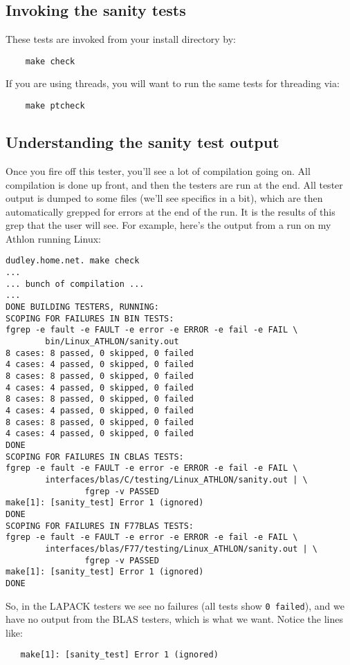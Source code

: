 \documentclass[11pt]{article}
\begin{document}
\subsection{Invoking the sanity tests}
These tests are invoked from your install directory by:
\begin{verbatim}
    make check
\end{verbatim}

If you are using threads, you will want to run the same tests for threading
via:
\begin{verbatim}
    make ptcheck
\end{verbatim}

\subsection{Understanding the sanity test output}
Once you fire off this tester, you'll see a lot of compilation going on.
All compilation is done up front, and then the testers are run at the end.
All tester output is dumped to some files (we'll see specifics in a bit),
which are then automatically grepped for errors at the end of the run.  It
is the results of this grep that the user will see.  For example, here's
the output from a run on my Athlon running Linux:
\begin{verbatim}
dudley.home.net. make check
...
... bunch of compilation ...
...
DONE BUILDING TESTERS, RUNNING:
SCOPING FOR FAILURES IN BIN TESTS:
fgrep -e fault -e FAULT -e error -e ERROR -e fail -e FAIL \
        bin/Linux_ATHLON/sanity.out
8 cases: 8 passed, 0 skipped, 0 failed
4 cases: 4 passed, 0 skipped, 0 failed
8 cases: 8 passed, 0 skipped, 0 failed
4 cases: 4 passed, 0 skipped, 0 failed
8 cases: 8 passed, 0 skipped, 0 failed
4 cases: 4 passed, 0 skipped, 0 failed
8 cases: 8 passed, 0 skipped, 0 failed
4 cases: 4 passed, 0 skipped, 0 failed
DONE
SCOPING FOR FAILURES IN CBLAS TESTS:
fgrep -e fault -e FAULT -e error -e ERROR -e fail -e FAIL \
        interfaces/blas/C/testing/Linux_ATHLON/sanity.out | \
                fgrep -v PASSED
make[1]: [sanity_test] Error 1 (ignored)
DONE
SCOPING FOR FAILURES IN F77BLAS TESTS:
fgrep -e fault -e FAULT -e error -e ERROR -e fail -e FAIL \
        interfaces/blas/F77/testing/Linux_ATHLON/sanity.out | \
                fgrep -v PASSED
make[1]: [sanity_test] Error 1 (ignored)
DONE
\end{verbatim}

So, in the LAPACK testers we see no failures (all tests show 
{\tt 0 failed}), and we have no output from the BLAS testers, which is
what we want.  Notice the lines like:
\begin{verbatim}
   make[1]: [sanity_test] Error 1 (ignored)
\end{verbatim}
\end{document}

